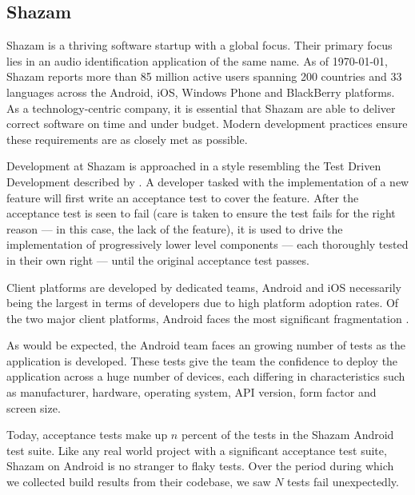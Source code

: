 
\subsection{Shazam}

Shazam is a thriving software startup with a global focus. Their primary focus lies in an audio identification application of the same name. As of \today, Shazam reports more than 85 million active users spanning 200 countries and 33 languages across the Android, iOS, Windows Phone and BlackBerry platforms. As a technology-centric company, it is essential that Shazam are able to deliver correct software on time and under budget. Modern development practices ensure these requirements are as closely met as possible.

Development at Shazam is approached in a style resembling the Test Driven Development described by \citet*{freeman2009growing}. A developer tasked with the implementation of a new feature will first write an acceptance test to cover the feature. After the acceptance test is seen to fail (care is taken to ensure the test fails for the right reason --- in this case, the lack of the feature), it is used to drive the implementation of progressively lower level components --- each thoroughly tested in their own right --- until the original acceptance test passes.

Client platforms are developed by dedicated teams, Android and iOS necessarily being the largest in terms of developers due to high platform adoption rates. Of the two major client platforms, Android faces the most significant fragmentation \cite{AndroidFragmentationVisualized}.

As would be expected, the Android team faces an growing number of tests as the application is developed.  These tests give the team the confidence to deploy the application across a huge number of devices, each differing in characteristics such as manufacturer, hardware, operating system, API version, form factor and screen size.

Today, acceptance tests make up $n$ percent of the tests in the Shazam Android test suite. Like any real world project with a significant acceptance test suite, Shazam on Android is no stranger to flaky tests. Over the period  during which we collected build results from their codebase, we saw $N$ tests fail unexpectedly.


